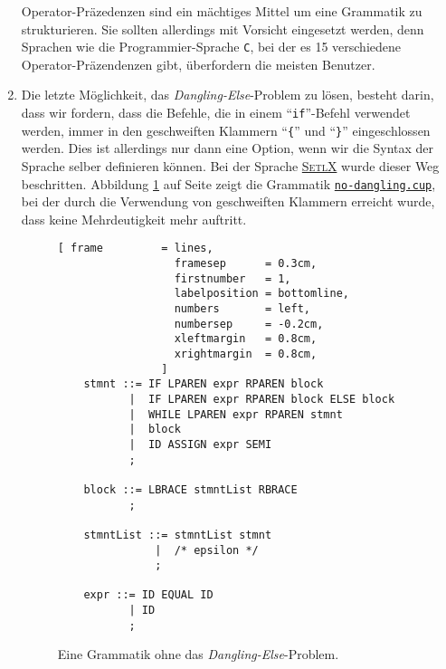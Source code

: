 \begin{enumerate}
      Operator-Pr\"azedenzen sind ein m\"achtiges Mittel um eine Grammatik zu strukturieren.  Sie
      sollten allerdings mit Vorsicht eingesetzt werden, denn Sprachen wie die
      Programmier-Sprache \texttt{C}, bei der es 15 verschiedene Operator-Pr\"azendenzen gibt, \"uberfordern
      die meisten Benutzer.
\item Die letzte M\"oglichkeit, das \emph{Dangling-Else}-Problem zu l\"osen, besteht darin, dass wir
      fordern, dass die Befehle, die in einem ``\texttt{if}''-Befehl verwendet werden, immer in den geschweiften
      Klammern ``\texttt{\{}'' und ``\texttt{\}}'' eingeschlossen werden.  Dies ist allerdings nur
      dann eine Option, wenn wir die Syntax der Sprache selber definieren k\"onnen.  Bei der Sprache
      \href{http://randoom.org/Software/SetlX}{\textsc{SetlX}}
      wurde dieser Weg beschritten.  Abbildung \ref{fig:dangling-else-brace.cup} auf Seite
      \pageref{fig:dangling-else-brace.cup} zeigt die Grammatik
      \href{https://github.com/karlstroetmann/Formal-Languages/tree/master/Cup/DanglingBrace/no-dangling.cup}{\texttt{no-dangling.cup}},
      bei der durch die Verwendung von geschweiften Klammern erreicht wurde, dass keine
      Mehrdeutigkeit mehr auftritt. 

\begin{figure}[!ht]
\centering
\begin{Verbatim}[ frame         = lines, 
                  framesep      = 0.3cm, 
                  firstnumber   = 1,
                  labelposition = bottomline,
                  numbers       = left,
                  numbersep     = -0.2cm,
                  xleftmargin   = 0.8cm,
                  xrightmargin  = 0.8cm,
                ]
    stmnt ::= IF LPAREN expr RPAREN block            
           |  IF LPAREN expr RPAREN block ELSE block
           |  WHILE LPAREN expr RPAREN stmnt
           |  block
           |  ID ASSIGN expr SEMI
           ;
    
    block ::= LBRACE stmntList RBRACE
           ;
    
    stmntList ::= stmntList stmnt
               |  /* epsilon */
               ;    

    expr ::= ID EQUAL ID
           | ID
           ;
\end{Verbatim}
\vspace*{-0.3cm}
\caption{Eine Grammatik ohne das \emph{Dangling-Else}-Problem.}
\label{fig:dangling-else-brace.cup}
\end{figure}

\end{enumerate}
 


